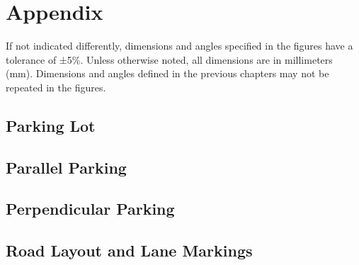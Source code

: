 \appendix
\chapter{Appendix}
If not indicated differently, dimensions and angles specified in the figures
have a tolerance of ±5\%. Unless otherwise noted, all dimensions are in
millimeters (mm). Dimensions and angles defined in the previous chapters may
not be repeated in the figures.

\section{Parking Lot}
\label{fig_parking_lot}
\begin{figure}[H]
	\begin{center}
		\centering
	\end{center}
\end{figure}

\section{Parallel Parking}
\label{fig_parallel_parking}
\begin{figure}[H]
	\begin{center}
		\centering
	\end{center}
\end{figure}

\section{Perpendicular Parking}
\begin{figure}[H]
	\label{fig_perpendicular_parking}
	\begin{center}
		\centering
	\end{center}
\end{figure}

\section{Road Layout and Lane Markings}
\label{fig_road_layout}
\begin{figure}[H]
	\begin{center}
		\centering
	\end{center}
\end{figure}

